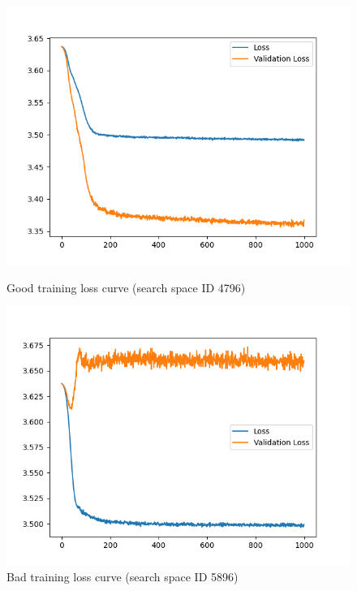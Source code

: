 \documentclass[12pt, twoside, ngerman]{report}
\begin{document}
\begin{figure}[h]%
\centering
\begin{minipage}{0.45\textwidth}
\includegraphics[width=\textwidth]{images/GoodLossCurve4796}
\caption{Good training loss curve (search space ID 4796)}
    \label{fig:GoodLossCurve4796}
\end{minipage}\hfill
\begin{minipage}{0.45\textwidth}
\includegraphics[width=\textwidth]{images/NegativeLearning5860}
\caption{Bad training loss curve (search space ID 5896)}
    \label{fig:NegativeLearning5860}
\end{minipage}
\end{figure}
\end{document}
